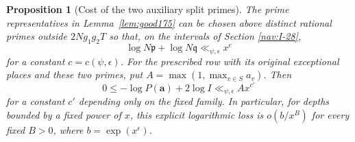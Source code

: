 \documentclass[a4paper,11pt]{article}
\newtheorem{proposition}{Proposition}[section]
\theoremstyle{definition}
\theoremstyle{remark}
\numberwithin{equation}{section}
\begin{document}
\begin{proposition}[Cost of the two auxiliary split primes]
\label{prop:cost177}
The prime representatives in Lemma~\ref{lem:good175} can be
chosen above distinct rational primes outside \(2Ng_1g_2T\)
so that, on the intervals of Section \ref{nav:I-28},
\[
      \log N\mathfrak p+\log N\mathfrak q\ll_{\psi,\epsilon} x^c
\]
for a constant \(c=c(\psi,\epsilon)\). For the prescribed row
with its original exceptional places and these two primes,
put \(A=\max(1,\max_{v\in S}a_v)\). Then
\[
 0\le -\log P(\mathbf a)+2\log I\ll_{\psi,\epsilon} A x^{c'}
\]
for a constant \(c'\) depending only on the fixed family.
In particular, for depths bounded by a fixed power of \(x\),
this explicit logarithmic loss is \(o(b/x^B)\) for every fixed
\(B>0\), where \(b=\exp(x^\epsilon)\).
\end{proposition}
\end{document}
